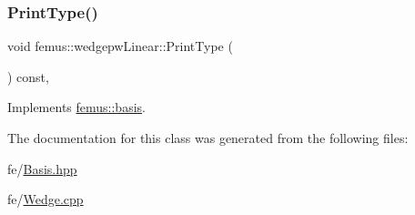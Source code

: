 \mbox{\label{classfemus_1_1wedgepw_linear_a8e819b24410a5710c4148cd3518dac29}} 
\subsubsection{\texorpdfstring{Print\+Type()}{PrintType()}}
{\footnotesize\ttfamily void femus\+::wedgepw\+Linear\+::\+Print\+Type (\begin{DoxyParamCaption}{ }\end{DoxyParamCaption}) const\hspace{0.3cm}{\ttfamily [inline]}, {\ttfamily [virtual]}}



Implements \mbox{\hyperlink{classfemus_1_1basis_abbae7bf8f31ec5793c911bc6d4ea0572}{femus\+::basis}}.



The documentation for this class was generated from the following files\+:\begin{DoxyCompactItemize}
\item 
fe/\mbox{\hyperlink{_basis_8hpp}{Basis.\+hpp}}\item 
fe/\mbox{\hyperlink{_wedge_8cpp}{Wedge.\+cpp}}\end{DoxyCompactItemize}
